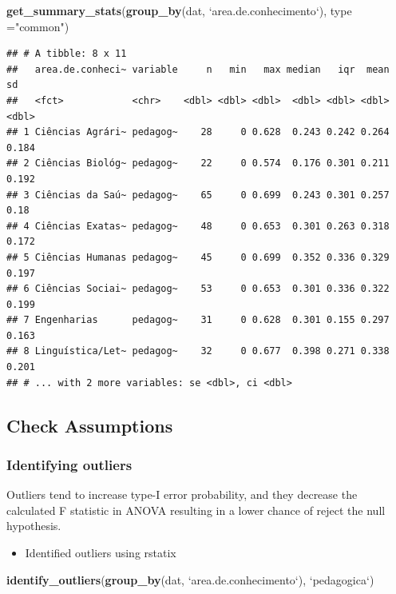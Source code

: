 \documentclass[]{article}
\newenvironment{Shaded}{\begin{snugshade}}{\end{snugshade}}
\newcommand{\DataTypeTok}[1]{\textcolor[rgb]{0.13,0.29,0.53}{#1}}
\newcommand{\KeywordTok}[1]{\textcolor[rgb]{0.13,0.29,0.53}{\textbf{#1}}}
\newcommand{\NormalTok}[1]{#1}
\newcommand{\StringTok}[1]{\textcolor[rgb]{0.31,0.60,0.02}{#1}}
\providecommand{\tightlist}{%
  \setlength{\itemsep}{0pt}\setlength{\parskip}{0pt}}
\begin{document}
\begin{Shaded}
\begin{Highlighting}[]
\KeywordTok{get_summary_stats}\NormalTok{(}\KeywordTok{group_by}\NormalTok{(dat, }\StringTok{`}\DataTypeTok{area.de.conhecimento}\StringTok{`}\NormalTok{), }\DataTypeTok{type =}\StringTok{"common"}\NormalTok{)}
\end{Highlighting}
\end{Shaded}

\begin{verbatim}
## # A tibble: 8 x 11
##   area.de.conheci~ variable     n   min   max median   iqr  mean    sd
##   <fct>            <chr>    <dbl> <dbl> <dbl>  <dbl> <dbl> <dbl> <dbl>
## 1 Ciências Agrári~ pedagog~    28     0 0.628  0.243 0.242 0.264 0.184
## 2 Ciências Biológ~ pedagog~    22     0 0.574  0.176 0.301 0.211 0.192
## 3 Ciências da Saú~ pedagog~    65     0 0.699  0.243 0.301 0.257 0.18 
## 4 Ciências Exatas~ pedagog~    48     0 0.653  0.301 0.263 0.318 0.172
## 5 Ciências Humanas pedagog~    45     0 0.699  0.352 0.336 0.329 0.197
## 6 Ciências Sociai~ pedagog~    53     0 0.653  0.301 0.336 0.322 0.199
## 7 Engenharias      pedagog~    31     0 0.628  0.301 0.155 0.297 0.163
## 8 Linguística/Let~ pedagog~    32     0 0.677  0.398 0.271 0.338 0.201
## # ... with 2 more variables: se <dbl>, ci <dbl>
\end{verbatim}

\hypertarget{check-assumptions}{%
\subsection{Check Assumptions}\label{check-assumptions}}

\hypertarget{identifying-outliers}{%
\subsubsection{Identifying outliers}\label{identifying-outliers}}

Outliers tend to increase type-I error probability, and they decrease
the calculated F statistic in ANOVA resulting in a lower chance of
reject the null hypothesis.

\begin{itemize}
\tightlist
\item
  Identified outliers using rstatix
\end{itemize}

\begin{Shaded}
\begin{Highlighting}[]
\KeywordTok{identify_outliers}\NormalTok{(}\KeywordTok{group_by}\NormalTok{(dat, }\StringTok{`}\DataTypeTok{area.de.conhecimento}\StringTok{`}\NormalTok{), }\StringTok{`}\DataTypeTok{pedagogica}\StringTok{`}\NormalTok{)}
\end{Highlighting}
\end{Shaded}
\end{document}
